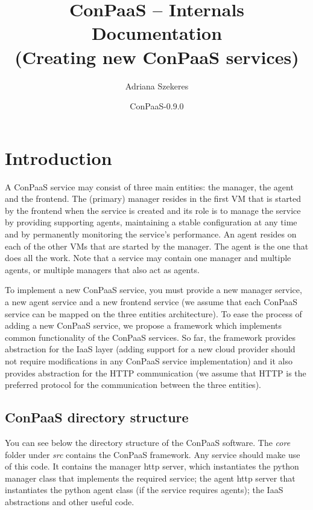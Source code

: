 \documentclass[10pt]{article}
\begin{document}
\title{ConPaaS -- Internals Documentation\\ \large (Creating new ConPaaS services)}
\author{Adriana Szekeres}
\date{ConPaaS-0.9.0}
\maketitle

\vfil
\tableofcontents
\newpage

\section{Introduction}

A ConPaaS service may consist of three main entities: the manager, the agent and the frontend. The (primary) manager resides in the first VM that is started by the frontend when the service is created and its role is to manage the service by providing supporting agents, maintaining a stable configuration at any time and by permanently monitoring the service's performance. An agent resides on each of the other VMs that are started by the manager. The agent is the one that does all the work. Note that a service may contain one manager and multiple agents, or multiple managers that also act as agents.

To implement a new ConPaaS service, you must provide a new manager service, a new agent service and a new frontend service (we assume that each ConPaaS service can be mapped on the three entities architecture). To ease the process of adding a new ConPaaS service, we propose a framework which implements common functionality of the ConPaaS services. So far, the framework provides abstraction for the IaaS layer (adding support for a new cloud provider should not require modifications in any ConPaaS service implementation) and it also provides abstraction for the HTTP communication (we assume that HTTP is the preferred protocol for the communication between the three entities).   

\subsection{ConPaaS directory structure}

You can see below the directory structure of the ConPaaS software. The \textit{core} folder under \textit{src} contains the ConPaaS framework. Any service should make use of this code. It contains the manager http server, which instantiates the python manager class that implements the required service; the agent http server that instantiates the python agent class (if the service requires agents); the IaaS abstractions and other useful code. 
\end{document}
